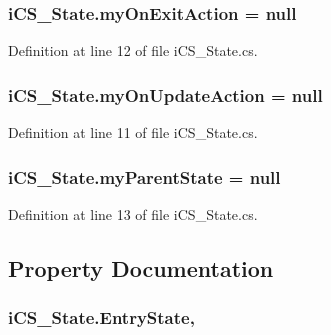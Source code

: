 \hypertarget{classi_c_s___state_a447a79c8f7a31dd3d6b63ca9cb61612a}{
\subsubsection[{my\+On\+Exit\+Action}]{ i\+C\+S\+\_\+\+State.\+my\+On\+Exit\+Action = null}}\label{classi_c_s___state_a447a79c8f7a31dd3d6b63ca9cb61612a}


Definition at line 12 of file i\+C\+S\+\_\+\+State.\+cs.

\hypertarget{classi_c_s___state_a2f4ccaf8ae0c24bc895b3dcce7a50a01}{
\subsubsection[{my\+On\+Update\+Action}]{ i\+C\+S\+\_\+\+State.\+my\+On\+Update\+Action = null}}\label{classi_c_s___state_a2f4ccaf8ae0c24bc895b3dcce7a50a01}


Definition at line 11 of file i\+C\+S\+\_\+\+State.\+cs.

\hypertarget{classi_c_s___state_a936f5a63a63d2a17d129bfd0aadaee19}{
\subsubsection[{my\+Parent\+State}]{ i\+C\+S\+\_\+\+State.\+my\+Parent\+State = null}}\label{classi_c_s___state_a936f5a63a63d2a17d129bfd0aadaee19}


Definition at line 13 of file i\+C\+S\+\_\+\+State.\+cs.



\subsection{Property Documentation}
\hypertarget{classi_c_s___state_a7954d179eadef63d55e73a1713840297}{
\subsubsection[{Entry\+State}]{ i\+C\+S\+\_\+\+State.\+Entry\+State\hspace{0.3cm}{\ttfamily [get]}, {\ttfamily [set]}}}\label{classi_c_s___state_a7954d179eadef63d55e73a1713840297}


